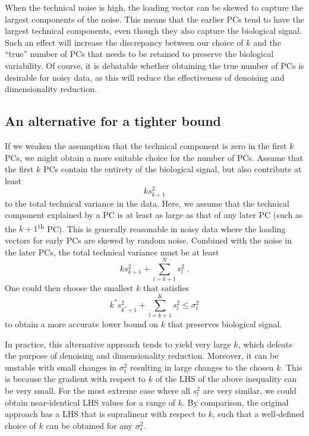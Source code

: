 \documentclass{article}
\begin{document}
When the technical noise is high, the loading vector can be skewed to capture the largest components of the noise.
This means that the earlier PCs tend to have the largest technical components, even though they also capture the biological signal.
Such an effect will increase the discrepancy between our choice of $k$ and the ``true'' number of PCs that needs to be retained to preserve the biological variability.
Of course, it is debatable whether obtaining the true number of PCs is desirable for noisy data, as this will reduce the effectiveness of denoising and dimensionality reduction. 

\subsection{An alternative for a tighter bound}
If we weaken the assumption that the technical component is zero in the first $k$ PCs, we might obtain a more suitable choice for the number of PCs.
Assume that the first $k$ PCs contain the entirety of the biological signal, but also contribute at least
\[
    k s^2_{k+1} 
\]
to the total technical variance in the data. 
Here, we assume that the technical component explained by a PC is at least as large as that of any later PC (such as the $k+1$\textsuperscript{th} PC).
This is generally reasonable in noisy data where the loading vectors for early PCs are skewed by random noise.
Combined with the noise in the later PCs, the total technical variance must be at least
\[
    k s^2_{k+1} + \sum_{l=k+1}^N s^2_l \;.
\]
One could then choose the smallest $k$ that satisfies
\[
    k^* s^2_{k^*+1} + \sum_{l=k+1}^K s^2_l \le \sigma^2_t  
\]
to obtain a more accurate lower bound on $k$ that preserves biological signal.

In practice, this alternative approach tends to yield very large $k$, which defeats the purpose of denoising and dimensionality reduction.
Moreover, it can be unstable with small changes in $\sigma^2_t$ resulting in large changes to the chosen $k$.
This is because the gradient with respect to $k$ of the LHS of the above inequality can be very small.
For the most extreme case where all $s^2_l$ are very similar, we could obtain near-identical LHS values for a range of $k$.
By comparison, the original approach has a LHS that is supralinear with respect to $k$, such that a well-defined choice of $k$ can be obtained for any $\sigma^2_t$.
\end{document}
